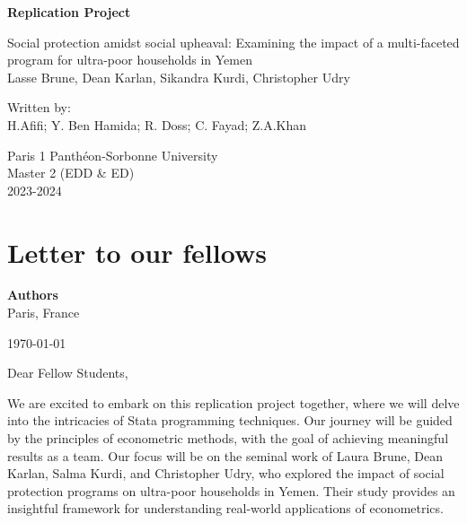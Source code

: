 \documentclass{article}
\begin{document}
\pagestyle{fancy}

\begin{titlepage}
    \centering
    \vspace*{1cm}
    
    \huge
    \textbf{Replication Project}

    \vspace{0.5cm}
    \huge
    Social protection amidst social upheaval:
    Examining the impact of a multi-faceted program  
    for ultra-poor households in Yemen\\
    \vspace{1cm}
    \large
    Lasse Brune, Dean Karlan, Sikandra Kurdi, Christopher Udry
    \vspace{2cm}
    
    \Large
    Written by:\\
    \large
    H.Afifi; Y. Ben Hamida; R. Doss; C. Fayad; Z.A.Khan\\
    \vfill

    \Large
    Paris 1 Panthéon-Sorbonne University\\
    Master 2  (EDD \& ED)\\
    \vspace{0.8cm}
    \Large
    2023-2024
\end{titlepage}


\newpage
\section*{Letter to our fellows}
\noindent
\textbf{Authors}\\
Paris, France\\
\vspace{0.5cm}

\noindent
\today\\
\vspace{0.5cm}


\noindent
Dear Fellow Students,\\
\vspace{0.5cm}


We are excited to embark on this replication project together, where we will delve into the intricacies of Stata programming techniques. Our journey will be guided by the principles of econometric methods, with the goal of achieving meaningful results as a team.
Our focus will be on the seminal work of Laura Brune, Dean Karlan, Salma Kurdi, and Christopher Udry, who explored the impact of social protection programs on ultra-poor households in Yemen. Their study provides an insightful framework for understanding real-world applications of econometrics.\newline
\end{document}
